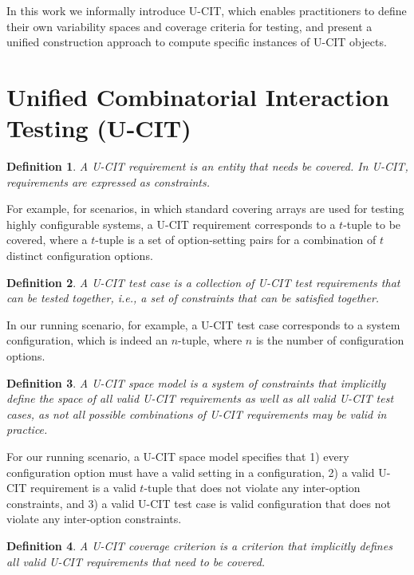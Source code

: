 \documentclass[EPiCempty]{easychair}
\newtheorem{definition}{Definition}
\begin{document}
In this work we informally introduce U-CIT, which enables practitioners to define their own variability spaces and coverage criteria for testing, and present a unified construction approach to compute specific instances of U-CIT objects.

\section{Unified Combinatorial Interaction Testing (U-CIT)}
\label{ucit}

\begin{definition}
A U-CIT requirement is an entity that needs be covered. In U-CIT, requirements are expressed as constraints. 
\end{definition}

For example, for scenarios, in which standard covering arrays are used for testing highly configurable systems, a U-CIT requirement corresponds to a $t$-tuple to be covered, where a $t$-tuple is a set of option-setting pairs for a combination of $t$ distinct configuration options.

\begin{definition}  
A U-CIT test case is a collection of U-CIT test requirements that can be tested together, i.e., a set of constraints that can be satisfied together.  
\end{definition}

In our running scenario, for example, a U-CIT test case corresponds to a system configuration, which is indeed an $n$-tuple,  where $n$ is the number of configuration options.

\begin{definition}
A U-CIT space model is a system of constraints that implicitly define the space of all valid U-CIT requirements as well as all valid U-CIT test cases, as not all possible combinations of U-CIT requirements may be valid in practice. 
\end{definition}

For our running scenario, a U-CIT space model specifies that 1) every configuration option must have a valid setting in a configuration, 2) a valid U-CIT requirement is a valid $t$-tuple that does not violate any inter-option constraints, and 3) a valid U-CIT test case is valid configuration that does not violate any inter-option constraints.

\begin{definition}
A U-CIT coverage criterion is a criterion that implicitly defines all valid U-CIT requirements that need to be covered.
\end{definition}
\end{document}
